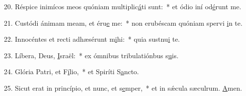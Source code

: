 20. Réspice inimícos meos quóniam multiplic\uline{á}ti sunt:~* et ódio iní od\uline{é}runt me.\par 
21. Custódi ánimam meam, et éru\uline{e} me:~* non erubéscam quóniam spervi \uline{i}n te.\par 
22. Innocéntes et recti adhæsérunt m\uline{i}hi:~* quia sustnu\uline{i} te.\par 
23. Líbera, Deus, \uline{I}sraël:~* ex ómnibus tribulatiónbus s\uline{u}is.\par 
24. Glória Patri, et F\uline{í}lio,~* et Spiríti S\uline{a}ncto.\par 
25. Sicut erat in princípio, et nunc, et s\uline{e}mper,~* et in sǽcula sæculrum. \uline{A}men.\par 
